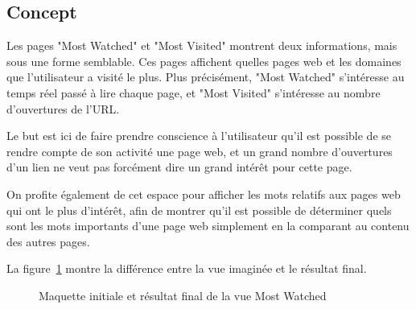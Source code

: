	\subsection{Concept}

		Les pages "Most Watched" et "Most Visited" montrent deux informations, mais sous une forme semblable. Ces pages affichent quelles pages web et les domaines que l'utilisateur a visité le plus. Plus précisément, "Most Watched" s'intéresse au temps réel passé à lire chaque page, et "Most Visited" s'intéresse au nombre d'ouvertures de l'URL.

		Le but est ici de faire prendre conscience à l'utilisateur qu'il est possible de se rendre compte de son activité une page web, et un grand nombre d'ouvertures d'un lien ne veut pas forcément dire un grand intérêt pour cette page.

		On profite également de cet espace pour afficher les mots relatifs aux pages web qui ont le plus d'intérêt, afin de montrer qu'il est possible de déterminer quels sont les mots importants d'une page web simplement en la comparant au contenu des autres pages.

		La figure~\ref{mostwatched_images} montre la différence entre la vue imaginée et le résultat final.

		\begin{figure}[!h]
			\centering
			\caption{Maquette initiale et résultat final de la vue Most Watched}
			\label{mostwatched_images}
		\end{figure}

